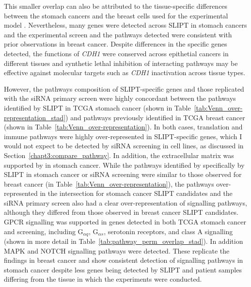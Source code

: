 This smaller overlap can also be attributed to the tissue-specific differences between the stomach cancers and the breast cells used for the experimental model \citep{Chen2014}. Nevertheless, many genes were detected across \gls{SLIPT} in stomach cancers and the experimental screen \citep{Telford2015} and the \glspl{pathway} detected were consistent with prior observations in breast cancer. Despite differences in the specific genes detected, the functions of \textit{CDH1} were conserved across epithetial cancers in different tissues and \gls{synthetic lethal} inhibition of interacting \glspl{pathway} may be effective against molecular targets such as \textit{CDH1} inactivation across tissue types.

However, the \glspl{pathway} composition of \gls{SLIPT}-specific genes and those replicated with the \gls{siRNA} primary screen \citep{Telford2015} were highly concordant between the \glspl{pathway} identified by \gls{SLIPT} in \gls{TCGA} stomach cancer (shown in Table~\ref{tab:Venn_over-representation_stad}) and \glspl{pathway} previously identified in \gls{TCGA} breast cancer (shown in Table~\ref{tab:Venn_over-representation}). In both cases, translation and immune \glspl{pathway} were highly over-represented in \gls{SLIPT}-specific genes, which I would not expect to be detected by \gls{siRNA} screening in cell lines, as discussed in Section~\ref{chapt3:compare_pathway}. In addition, the extracellular matrix was supported by in stomach cancer. While the \glspl{pathway} identified by specifically by \gls{SLIPT} in stomach cancer or \gls{siRNA} screening were similar to those observed for breast cancer (in Table~\ref{tab:Venn_over-representation}), the \glspl{pathway} over-represented in the intersection for stomach cancer \gls{SLIPT} candidates and the \gls{siRNA} primary screen \citep{Telford2015} also had a clear over-representation of signalling \glspl{pathway}, although they differed from those observed in breast cancer \gls{SLIPT} candidates. \gls{GPCR} signalling was supported in genes detected in both \gls{TCGA} stomach cancer and screening, including G$_{\alpha q}$, G$_{\alpha s}$, serotonin receptors, and class A signalling (shown in more detail in Table~\ref{tab:pathway_perm_overlap_stad}). In addition MAPK and NOTCH signalling \glspl{pathway} were detected. These replicate the findings in breast cancer and show consistent detection of signalling \glspl{pathway} in stomach cancer despite less genes being detected by \gls{SLIPT} and patient samples differing from the tissue in which the experiments were conducted.

